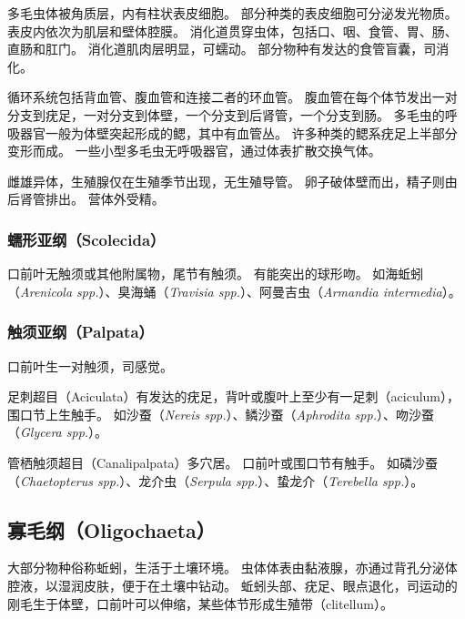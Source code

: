 \documentclass[11pt]{article}
\begin{document}
多毛虫体被角质层，内有柱状表皮细胞。
部分种类的表皮细胞可分泌发光物质。
表皮内依次为肌层和壁体腔膜。
消化道贯穿虫体，包括口、咽、食管、胃、肠、直肠和肛门。
消化道肌肉层明显，可蠕动。
部分物种有发达的食管盲囊，司消化。

\newline

循环系统包括背血管、腹血管和连接二者的环血管。
腹血管在每个体节发出一对分支到疣足，一对分支到体壁，一个分支到后肾管，一个分支到肠。
多毛虫的呼吸器官一般为体壁突起形成的鳃，其中有血管丛。
许多种类的鳃系疣足上半部分变形而成。
一些小型多毛虫无呼吸器官，通过体表扩散交换气体。

\newline

雌雄异体，生殖腺仅在生殖季节出现，无生殖导管。
卵子破体壁而出，精子则由后肾管排出。
营体外受精。

\subsubsection{蠕形亚纲（Scolecida）}
口前叶无触须或其他附属物，尾节有触须。
有能突出的球形吻。
如海蚯蚓（\textit{Arenicola spp.}）、臭海蛹（\textit{Travisia spp.}）、阿曼吉虫（\textit{Armandia intermedia}）。

\subsubsection{触须亚纲（Palpata）}
口前叶生一对触须，司感觉。

\newline

足刺超目（Aciculata）有发达的疣足，背叶或腹叶上至少有一足刺（aciculum），围口节上生触手。
如沙蚕（\textit{Nereis spp.}）、鳞沙蚕（\textit{Aphrodita spp.}）、吻沙蚕（\textit{Glycera spp.}）。

\newline

管栖触须超目（Canalipalpata）多穴居。
口前叶或围口节有触手。
如磷沙蚕（\textit{Chaetopterus spp.}）、龙介虫（\textit{Serpula spp.}）、蛰龙介（\textit{Terebella spp.}）。

\subsection{寡毛纲（Oligochaeta）}
大部分物种俗称蚯蚓，生活于土壤环境。
虫体体表由黏液腺，亦通过背孔分泌体腔液，以湿润皮肤，便于在土壤中钻动。
蚯蚓头部、疣足、眼点退化，司运动的刚毛生于体壁，口前叶可以伸缩，某些体节形成生殖带（clitellum）。
\end{document}
